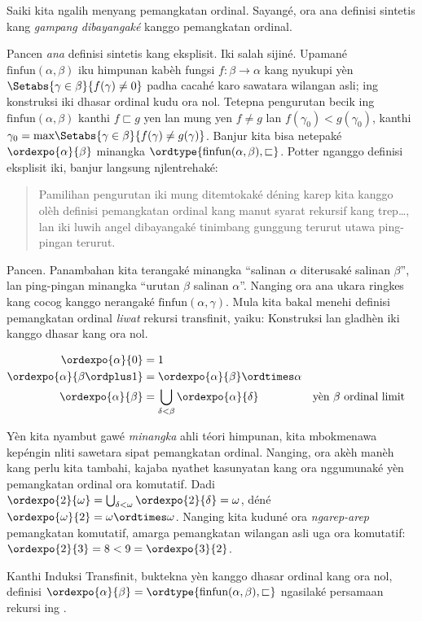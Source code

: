 \documentclass[../../../include/open-logic-section]{subfiles}
\begin{document}

Saiki kita ngalih menyang pemangkatan ordinal. Sayangé, ora ana
definisi sintetis kang \emph{gampang dibayangaké} kanggo
pemangkatan ordinal.

Pancen \emph{ana} definisi sintetis kang eksplisit. Iki salah
sijiné. Upamané $\text{finfun}(\alpha,\beta)$ iku himpunan kabèh
fungsi $f \colon \beta \to \alpha$ kang nyukupi yèn $\Setabs{\gamma \in
\beta}{f(\gamma) \neq 0}$ padha cacahé karo sawatara wilangan asli;
ing konstruksi iki dhasar ordinal kudu ora nol. Tetepna pengurutan
becik ing $\text{finfun}(\alpha,\beta)$ kanthi $f
\sqsubset g$ yen lan mung yen $f \neq g$ lan $f(\gamma_0) < g(\gamma_0)$, kanthi
$\gamma_0 = \text{max}\Setabs{\gamma \in \beta}{f(\gamma) \neq
g(\gamma)}$. Banjur kita bisa netepaké $\ordexpo{\alpha}{\beta}$
minangka $\ordtype{\text{finfun}(\alpha, \beta), \sqsubset}$. Potter
nganggo definisi eksplisit iki, banjur langsung njlentrehaké:
\begin{quote}
	Pamilihan pengurutan iki mung ditemtokaké déning karep kita
	kanggo olèh definisi pemangkatan ordinal kang manut syarat
	rekursif kang trep\ldots, lan iki luwih angel dibayangaké
	tinimbang gunggung terurut utawa ping-pingan terurut.
	\citep[kaca~199]{Potter2004}
\end{quote}
Pancen. Panambahan kita terangaké minangka “salinan $\alpha$
diterusaké salinan $\beta$”, lan ping-pingan minangka “urutan
$\beta$ salinan $\alpha$”. Nanging ora ana ukara ringkes kang
cocog kanggo nerangaké $\text{finfun}(\alpha, \gamma)$. Mula kita
bakal menehi definisi pemangkatan ordinal \emph{liwat} rekursi
transfinit, yaiku:
Konstruksi lan gladhèn iki kanggo dhasar kang ora nol.

\begin{defn}
\begin{align*}
	\ordexpo{\alpha}{0} &= 1\\
	\ordexpo{\alpha}{\beta\ordplus 1} &=\ordexpo{\alpha}{\beta} \ordtimes \alpha\\
	\ordexpo{\alpha}{\beta} &= \bigcup_{\delta < \beta}\ordexpo{\alpha}{\delta}& & \text{yèn $\beta$ ordinal limit}
\end{align*}
\end{defn}

Yèn kita nyambut gawé \emph{minangka} ahli téori himpunan, kita
mbokmenawa kepéngin nliti sawetara sipat pemangkatan ordinal.
Nanging, ora akèh manèh kang perlu kita tambahi, kajaba nyathet
kasunyatan kang ora nggumunaké yèn pemangkatan ordinal ora
komutatif. Dadi $\ordexpo{2}{\omega} =
\bigcup_{\delta < \omega}\ordexpo{2}{\delta} = \omega$, déné
$\ordexpo{\omega}{2} = \omega \ordtimes \omega$. Nanging kita
kuduné ora \emph{ngarep-arep} pemangkatan komutatif, amarga
pemangkatan wilangan asli uga ora komutatif: $\ordexpo{2}{3} = 8 < 9 = \ordexpo{3}{2}$.

\begin{prob}
Kanthi Induksi Transfinit, buktekna yèn kanggo dhasar ordinal
kang ora nol, definisi
$\ordexpo{\alpha}{\beta} = \ordtype{\text{finfun}(\alpha, \beta),
\sqsubset}$ ngasilaké persamaan rekursi ing
.
\end{prob}
\end{document}
